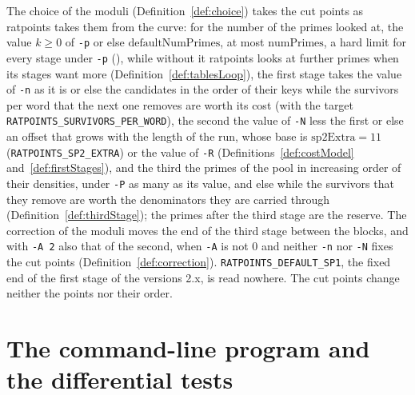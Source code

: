 The choice of the moduli (Definition~\ref{def:choice}) takes the cut points as ratpoints takes them
from the curve: for the number of the primes looked at, the value $k \ge 0$ of \verb|-p| or else
$\mathrm{defaultNumPrimes}$, at most $\mathrm{numPrimes}$, a hard limit for every stage under
\verb|-p| (), while without it ratpoints looks at further primes
when its stages want more (Definition~\ref{def:tablesLoop}), the first stage takes the value of
\verb|-n| as it is or else the candidates in the order of their keys while the survivors per word
that the next one removes are worth its cost (with the target \verb|RATPOINTS_SURVIVORS_PER_WORD|),
the second the value of \verb|-N| less the first or else an offset that grows with the length of the
run, whose base is $\mathrm{sp2Extra} = 11$ (\verb|RATPOINTS_SP2_EXTRA|) or the value of \verb|-R|
(Definitions~\ref{def:costModel} and~\ref{def:firstStages}), and the third the primes of the pool in
increasing order of their densities, under \verb|-P| as many as its value, and else while the
survivors that they remove are worth the denominators they are carried through
(Definition~\ref{def:thirdStage}); the primes after the third stage are the reserve. The correction
of the moduli moves the end of the third stage between the blocks, and with \verb|-A 2| also that of
the second, when \verb|-A| is not $0$ and neither \verb|-n| nor \verb|-N| fixes the cut points
(Definition~\ref{def:correction}). \verb|RATPOINTS_DEFAULT_SP1|, the fixed end of the first stage of
the versions 2.x, is read nowhere. The cut points change neither the points nor their order.

\section{The command-line program and the differential tests}\label{sec:stagesCli}

